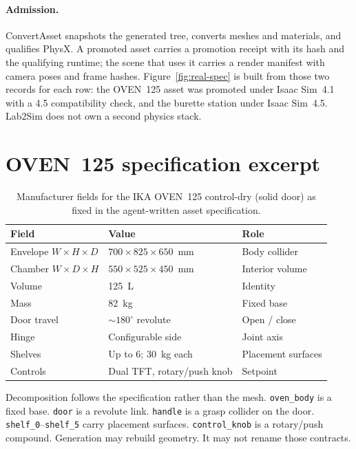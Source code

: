 \paragraph{Admission.}
ConvertAsset snapshots the generated tree, converts meshes and materials,
and qualifies PhysX. A promoted asset carries a promotion receipt with its
hash and the qualifying runtime; the scene that uses it carries a render
manifest with camera poses and frame hashes. Figure~\ref{fig:real-spec} is
built from those two records for each row: the OVEN~125 asset was promoted
under Isaac Sim~4.1 with a 4.5 compatibility check, and the burette station
under Isaac Sim~4.5. Lab2Sim does not own a second physics stack.

\section{OVEN~125 specification excerpt}
\label{app:spec}

\begin{table}[h]
  \centering
  \small
  \caption{Manufacturer fields for the IKA OVEN~125 control-dry (solid door)
  as fixed in the agent-written asset specification.}
  \label{tab:oven-spec}
  \begin{tabular}{@{}llp{3.4cm}@{}}
    \toprule
    Field & Value & Role \\
    \midrule
    Envelope $W{\times}H{\times}D$ & $700{\times}825{\times}650$~mm & Body collider \\
    Chamber $W{\times}D{\times}H$ & $550{\times}525{\times}450$~mm & Interior volume \\
    Volume & 125~L & Identity \\
    Mass & 82~kg & Fixed base \\
    Door travel & ${\sim}180^{\circ}$ revolute & Open / close \\
    Hinge & Configurable side & Joint axis \\
    Shelves & Up to 6; 30~kg each & Placement surfaces \\
    Controls & Dual TFT, rotary/push knob & Setpoint \\
    \bottomrule
  \end{tabular}
\end{table}

Decomposition follows the specification rather than the mesh.
\texttt{oven\_body} is a fixed base. \texttt{door} is a revolute link.
\texttt{handle} is a grasp collider on the door.
\texttt{shelf\_0}--\texttt{shelf\_5} carry placement surfaces.
\texttt{control\_knob} is a rotary/push compound. Generation may rebuild
geometry. It may not rename those contracts.


